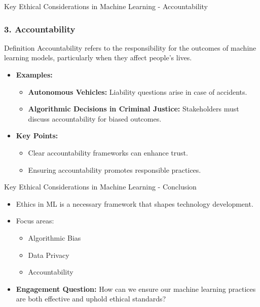 \documentclass[aspectratio=169]{beamer}
\begin{document}
\begin{frame}[fragile]{Key Ethical Considerations in Machine Learning - Accountability}
    \frametitle{3. Accountability}
    
    \begin{block}{Definition}
        Accountability refers to the responsibility for the outcomes of machine learning models, particularly when they affect people's lives.
    \end{block}
    
    \begin{itemize}
        \item \textbf{Examples:}
        \begin{itemize}
            \item \textbf{Autonomous Vehicles:} Liability questions arise in case of accidents.
            \item \textbf{Algorithmic Decisions in Criminal Justice:} Stakeholders must discuss accountability for biased outcomes.
        \end{itemize}
        
        \item \textbf{Key Points:}
        \begin{itemize}
            \item Clear accountability frameworks can enhance trust.
            \item Ensuring accountability promotes responsible practices.
        \end{itemize}
    \end{itemize}
\end{frame}

\begin{frame}[fragile]{Key Ethical Considerations in Machine Learning - Conclusion}
    \begin{itemize}
        \item Ethics in ML is a necessary framework that shapes technology development.
        \item Focus areas:
        \begin{itemize}
            \item Algorithmic Bias
            \item Data Privacy
            \item Accountability
        \end{itemize}
        \item \textbf{Engagement Question:} How can we ensure our machine learning practices are both effective and uphold ethical standards?
    \end{itemize}
\end{frame}
\end{document}
